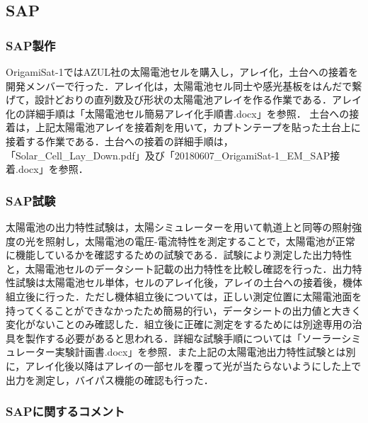 \subsection{SAP}
\subsubsection{SAP製作}
OrigamiSat-1ではAZUL社の太陽電池セルを購入し，アレイ化，土台への接着を開発メンバーで行った．アレイ化は，太陽電池セル同士や感光基板をはんだで繋げて，設計どおりの直列数及び形状の太陽電池アレイを作る作業である．アレイ化の詳細手順は「太陽電池セル簡易アレイ化手順書.docx」を参照．
土台への接着は，上記太陽電池アレイを接着剤を用いて，カプトンテープを貼った土台上に接着する作業である．土台への接着の詳細手順は，「Solar\_Cell\_Lay\_Down.pdf」及び「20180607\_OrigamiSat-1\_EM\_SAP接着.docx」を参照．
\subsubsection{SAP試験}
太陽電池の出力特性試験は，太陽シミュレーターを用いて軌道上と同等の照射強度の光を照射し，太陽電池の電圧-電流特性を測定することで，太陽電池が正常に機能しているかを確認するための試験である．試験により測定した出力特性と，太陽電池セルのデータシート記載の出力特性を比較し確認を行った．出力特性試験は太陽電池セル単体，セルのアレイ化後，アレイの土台への接着後，機体組立後に行った．ただし機体組立後については，正しい測定位置に太陽電池面を持ってくることができなかったため簡易的行い，データシートの出力値と大きく変化がないことのみ確認した．組立後に正確に測定をするためには別途専用の治具を製作する必要があると思われる．詳細な試験手順については「ソーラーシミュレーター実験計画書.docx」を参照．また上記の太陽電池出力特性試験とは別に，アレイ化後以降はアレイの一部セルを覆って光が当たらないようにした上で出力を測定し，バイパス機能の確認も行った．

\subsubsection{SAPに関するコメント}

